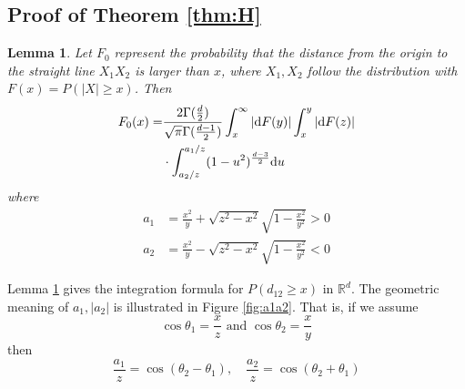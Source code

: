 \documentclass[conference,a4paper]{IEEEtran}
\def\R{\mathbb{R}}
\def\dd{\mathrm{d}}
\newtheorem{lemma}{Lemma}
\begin{document}
\subsection{Proof of Theorem \ref{thm:H}}\label{app:th}
\begin{lemma}\label{lem:F_0}
     Let $F_0$ represent the
probability that the distance from the origin to the straight line
$X_1X_2$ is larger than $x$, where $X_1, X_2$ follow the distribution with $F(x)=P(|X|\geq x)$.
Then 
\begin{align}\label{eq:F_0_expression}
     F_0(x)=&\frac{2\Gamma(\frac{d}{2})}
     {\sqrt{\pi}\Gamma(\frac{d-1}{2})}
     \int_x^{\infty} |\dd F(y)|
     \int_x^{y} |\dd F(z)| 
     \notag\\
     &\cdot \int_{a_2/z}^{a_1 /z} (1-u^2)^{\frac{d-3}{2}} \dd u
 \end{align}
where
\begin{align}
     a_1 & =\frac{x^2}{y}+\sqrt{z^2-x^2}\sqrt{1-\frac{x^2}{y^2}} > 0
     \label{eq:a_1} \\
a_2 & =\frac{x^2}{y}-\sqrt{z^2-x^2}\sqrt{1-\frac{x^2}{y^2}} < 0
\label{eq:a_2}
\end{align}
\end{lemma}
Lemma \ref{lem:F_0} gives the integration formula for $P(d_{12}\geq x)$ in $\R^d$.
The geometric meaning of $a_1, |a_2|$ is illustrated in Figure
\ref{fig:a1a2}. That is, if we assume
\begin{equation}\label{eq:theta_1_theta_2}
     \cos\theta_1=\frac{x}{z}
     \textrm{ and } \cos\theta_2=\frac{x}{y} 
\end{equation}
then
\begin{equation}\label{eq:a_1_a_2}
     \frac{a_1}{z} = \cos(\theta_2 - \theta_1),
     \quad
     \frac{a_2}{z} = \cos(\theta_2+\theta_1)           
\end{equation}
\end{document}
